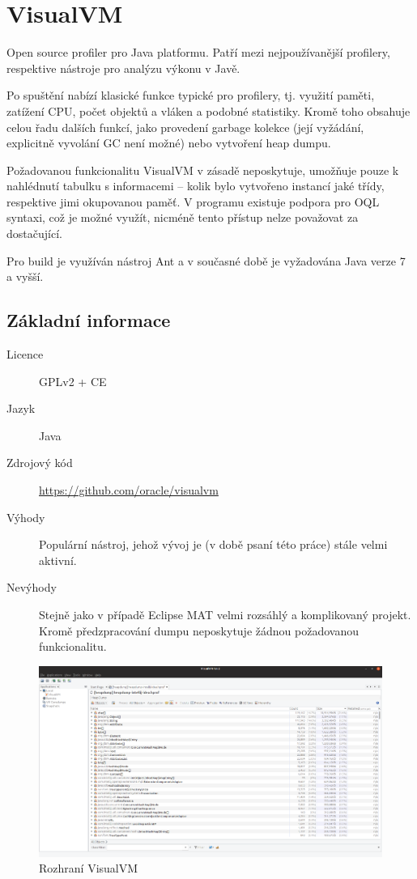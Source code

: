 \section{VisualVM}
Open source profiler pro Java platformu. Patří mezi nejpoužívanější profilery, respektive nástroje pro analýzu výkonu v Javě.

Po spuštění nabízí klasické funkce typické pro profilery, tj. využití paměti, zatížení CPU, počet objektů a vláken a podobné statistiky. Kromě toho obsahuje celou řadu dalších funkcí, jako provedení garbage kolekce (její vyžádání, explicitně vyvolání GC není možné) nebo vytvoření heap dumpu.

Požadovanou funkcionalitu VisualVM v zásadě neposkytuje, umožňuje pouze k nahlédnutí tabulku s informacemi – kolik bylo vytvořeno instancí jaké třídy, respektive jimi okupovanou paměť. V programu existuje podpora pro OQL syntaxi, což je možné využít, nicméně tento přístup nelze považovat za dostačující.

Pro build je využíván nástroj Ant a v současné době je vyžadována Java verze 7 a vyšší.

\subsection{Základní informace}

\begin{description}
    \item[Licence] GPLv2 + CE
    \item[Jazyk] Java
    \item[Zdrojový kód] \url{https://github.com/oracle/visualvm} 
    \item[Výhody] Populární nástroj, jehož vývoj je (v době psaní této práce) stále velmi aktivní.
    \item[Nevýhody] Stejně jako v případě Eclipse MAT velmi rozsáhlý a komplikovaný projekt. Kromě předzpracování dumpu neposkytuje žádnou požadovanou funkcionalitu.
\end{description}

\begin{figure}[ht!]
	\centering
	\includegraphics[scale=0.3]{obrazky/visualvm.png}
	\caption{Rozhraní VisualVM}
	\label{obr-visualvm}
\end{figure}

